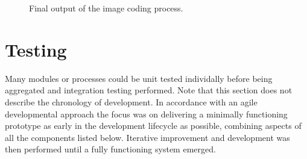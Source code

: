     
\begin{figure}[htp]
  \begin{center}
  \end{center}
  \caption{Final output of the image coding process.}
  \label{scn:images}
\end{figure}
    

\FloatBarrier
\section{Testing}

Many modules or processes could be unit tested individally before being aggregated and integration testing performed. Note that this section does not describe the chronology of development. In accordance with an agile developmental approach the focus was on delivering a minimally functioning prototype as early in the development lifecycle as possible, combining aspects of all the components listed below. Iterative improvement and development was then performed until a fully functioning system emerged.


